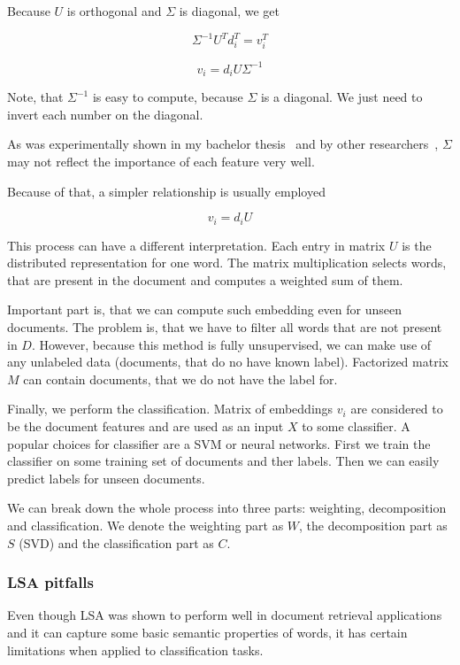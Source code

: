     Because $U$ is orthogonal and $\Sigma$ is diagonal, we get
    
    $$\Sigma^{-1} U^T d_i^T = v_i^T $$

    $$v_i = d_i U \Sigma^{-1} $$
    
    Note, that $\Sigma^{-1}$ is easy to compute, because $\Sigma$ is a diagonal. 
    We just need to invert each number on the diagonal.  
    
    As was experimentally shown in my bachelor thesis~\cite{macko2016} 
    and by other researchers~\cite{levy2015improving}, $\Sigma$ may not reflect the importance of each feature very well.
    
    Because of that, a simpler relationship is usually employed
    
    $$v_i = d_i U $$
    
    This process can have a different interpretation.
    Each entry in matrix $U$ is the distributed representation for one word.
    The matrix multiplication selects words, that are present in the document and computes a weighted sum of them.
    
    Important part is, that we can compute such embedding even for unseen documents.
    The problem is, that we have to filter all words that are not present in $D$. 
    However, because this method is fully unsupervised, we can make use of any unlabeled data (documents, that do no have known label). 
    Factorized matrix $M$ can contain documents, that we do not have the label for.
    
    Finally, we perform the classification.
    Matrix of embeddings $v_i$ are considered to be the document features and are used as an input $X$ to some classifier. 
    A popular choices for classifier are a SVM or neural networks.
    First we train the classifier on some training set of documents and ther labels.
    Then we can easily predict labels for unseen documents.
    
    We can break down the whole process into three parts: weighting, decomposition and classification.
    We denote the weighting part as $W$, the decomposition part as $S$ (SVD) and the classification part as $C$.
    
    \subsubsection{LSA pitfalls}

    Even though LSA was shown to perform well in document retrieval applications and it can capture some basic semantic properties of words,
    it has certain limitations when applied to classification tasks. 
    
